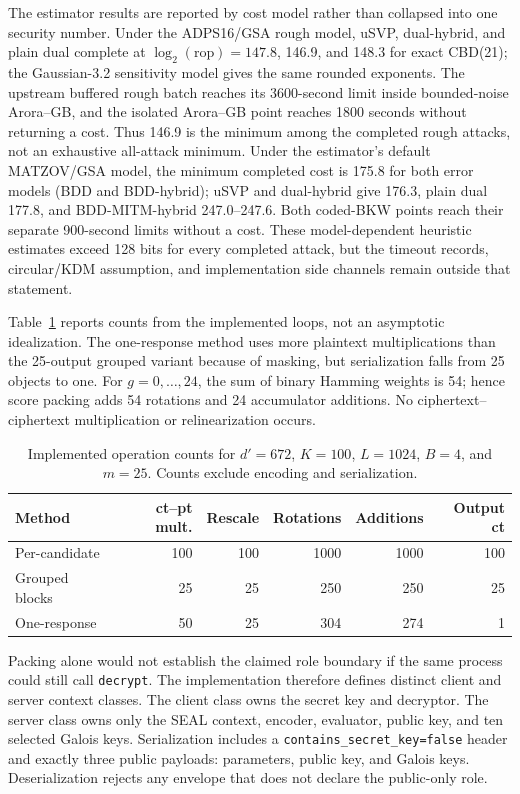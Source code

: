 \documentclass[pdflatex,sn-basic,Numbered]{sn-jnl}
\theoremstyle{plain}
\begin{document}
The estimator results are reported by cost model rather than collapsed into one security number. Under the ADPS16/GSA rough model, uSVP, dual-hybrid, and plain dual complete at $\log_2(\mathrm{rop})=147.8$, 146.9, and 148.3 for exact CBD(21); the Gaussian-3.2 sensitivity model gives the same rounded exponents. The upstream buffered rough batch reaches its 3600-second limit inside bounded-noise Arora--GB, and the isolated Arora--GB point reaches 1800 seconds without returning a cost. Thus 146.9 is the minimum among the completed rough attacks, not an exhaustive all-attack minimum. Under the estimator's default MATZOV/GSA model, the minimum completed cost is 175.8 for both error models (BDD and BDD-hybrid); uSVP and dual-hybrid give 176.3, plain dual 177.8, and BDD-MITM-hybrid 247.0--247.6. Both coded-BKW points reach their separate 900-second limits without a cost. These model-dependent heuristic estimates exceed 128 bits for every completed attack, but the timeout records, circular/KDM assumption, and implementation side channels remain outside that statement.

Table~\ref{tab:operations} reports counts from the implemented loops, not an asymptotic idealization. The one-response method uses more plaintext multiplications than the 25-output grouped variant because of masking, but serialization falls from 25 objects to one. For $g=0,\ldots,24$, the sum of binary Hamming weights is 54; hence score packing adds 54 rotations and 24 accumulator additions. No ciphertext--ciphertext multiplication or relinearization occurs.

\begin{table}[t]
\caption{Implemented operation counts for $d'=672$, $K=100$, $L=1024$, $B=4$, and $m=25$. Counts exclude encoding and serialization.}\label{tab:operations}
\centering
\small
\begin{tabular}{@{}lrrrrr@{}}
\toprule
Method & ct--pt mult. & Rescale & Rotations & Additions & Output ct \\
\midrule
Per-candidate & 100 & 100 & 1000 & 1000 & 100 \\
Grouped blocks & 25 & 25 & 250 & 250 & 25 \\
One-response & 50 & 25 & 304 & 274 & 1 \\
\bottomrule
\end{tabular}
\end{table}

Packing alone would not establish the claimed role boundary if the same process could still call \texttt{decrypt}. The implementation therefore defines distinct client and server context classes. The client class owns the secret key and decryptor. The server class owns only the SEAL context, encoder, evaluator, public key, and ten selected Galois keys. Serialization includes a \texttt{contains\_secret\_key=false} header and exactly three public payloads: parameters, public key, and Galois keys. Deserialization rejects any envelope that does not declare the public-only role.
\end{document}
